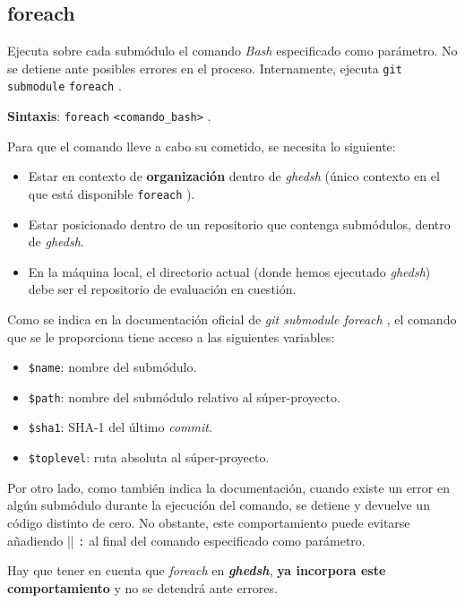\subsection{foreach}
\label{3.4.2}

Ejecuta sobre cada submódulo el comando {\it Bash} especificado como parámetro. No se detiene ante posibles errores en el proceso. Internamente, ejecuta \verb|git| \verb|submodule| \verb|foreach| .

\textbf{Sintaxis}: \verb|foreach| \verb|<comando_bash>| .

Para que el comando lleve a cabo su cometido, se necesita lo siguiente:
\begin{itemize}
	\item Estar en contexto de \textbf{organización} dentro de {\it ghedsh} (único contexto en el que está disponible \verb|foreach| ).
	\item Estar posicionado dentro de un repositorio que contenga submódulos, dentro de {\it ghedsh}.
	\item En la máquina local, el directorio actual (donde hemos ejecutado {\it ghedsh}) debe ser el repositorio de evaluación en cuestión.
\end{itemize}

Como se indica en la documentación oficial de  {\it git submodule foreach \cite{B29}}, el comando que se le proporciona tiene acceso a las siguientes variables:
\begin{itemize}
	\item \verb|$name|: nombre del submódulo.
	\item \verb|$path|: nombre del submódulo relativo al súper-proyecto.
	\item \verb|$sha1|: SHA-1\cite{B30} del último {\it commit}.
	\item \verb|$toplevel|: ruta absoluta al súper-proyecto.
\end{itemize}

Por otro lado, como también indica la documentación, cuando existe un error en algún submódulo durante la ejecución del comando, se detiene y devuelve un código distinto de cero.
No obstante, este comportamiento puede evitarse añadiendo \verb|||| \verb|:| al final del comando especificado como parámetro.
\bigskip

Hay que tener en cuenta que {\it foreach} en  \textbf{\it ghedsh}, \textbf{ya incorpora este comportamiento} y no se detendrá ante errores.


